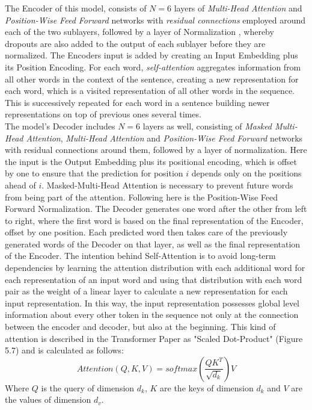 \documentclass[a4paper, 11pt,titlepage,oneside,openany]{book}
\begin{document}
\indent The Encoder of this model, consists of $N=6$ layers of \textit{Multi-Head Attention} and \textit{Position-Wise Feed Forward} networks with \textit{residual connections} \cite{residualcon} employed around each of the two sublayers, followed by a layer of Normalization \cite{normalization}, whereby dropouts \cite{dopout} are also added to the output of each sublayer before they are normalized. The Encoders input is added by creating an Input Embedding plus its Position Encoding. For each word, \textit{self-attention} aggregates information from all other words in the context of the sentence, creating a new representation for each word, which is a visited representation of all other words in the sequence. This is successively repeated for each word in a sentence  building newer representations on top of previous ones several times.\\
\indent The model's Decoder includes $N=6$ layers as well, consisting of \textit{Masked Multi-Head Attention}, \textit{Multi-Head Attention} and \textit{Position-Wise Feed Forward} networks with residual connections around them, followed by a layer of normalization. Here the input is the Output Embedding plus its positional encoding, which is offset by one to ensure that the prediction for position $i$ depends only on the positions ahead of $i$. Masked-Multi-Head Attention is necessary to prevent future words from being part of the attention. Following here is the Position-Wise Feed Forward Normalization. The Decoder generates one word after the other from left to right, where the first word is based on the final representation of the Encoder, offset by one position. Each predicted word then takes care of the previously generated words of the Decoder on that layer, as well as the final representation of the Encoder.
\indent The intention behind Self-Attention is to avoid long-term dependencies by learning the attention distribution with each additional word for each representation of an input word and using that distribution with each word pair as the weight of a linear layer to calculate a new representation for each input representation. In this way, the input representation possesses global level information about every other token in the sequence not only at the connection between the encoder and decoder, but also at the beginning. This kind of attention is described in the Transformer Paper as "Scaled Dot-Product" (Figure 5.7) and is calculated as follows:
\[
Attention(Q,K,V)=softmax(\frac{QK^T}{\sqrt{d_k}})V
\]
Where $Q$ is the query of  dimension $d_k$, $K$ are the keys of dimension $d_k$ and $V$ are the values of dimension $d_v$. \\
\end{document}
